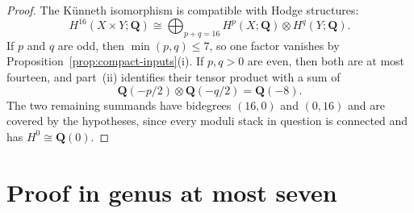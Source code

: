 \documentclass[12pt,reqno]{amsart}
\newcommand{\Q}{\mathbf{Q}}
\theoremstyle{definition}
\theoremstyle{remark}
\begin{document}
\begin{proof}
The K\"unneth isomorphism is compatible with Hodge structures:
\[
 H^{16}(X\times Y;\Q)
 \cong\bigoplus_{p+q=16}H^p(X;\Q)\otimes H^q(Y;\Q).
\]
If $p$ and $q$ are odd, then $\min(p,q)\leq7$, so one factor vanishes by
Proposition~\ref{prop:compact-inputs}(i).  If $p,q>0$ are even, then both
are at most fourteen, and part~(ii) identifies their tensor product with a
sum of
\[
 \Q(-p/2)\otimes\Q(-q/2)=\Q(-8).
\]
The two remaining summands have bidegrees $(16,0)$ and $(0,16)$ and are
covered by the hypotheses, since every moduli stack in question is
connected and has $H^0\cong\Q(0)$.
\end{proof}

\section{Proof in genus at most seven}
\label{sec:induction}
\end{document}
